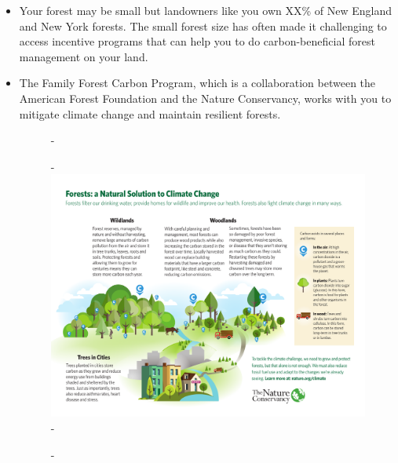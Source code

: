 \documentclass{article}\usepackage[]{graphicx}\usepackage[]{color}
\begin{document}
  \begin{itemize}
  \item Your forest may be small but landowners like you own XX\% of New England and New York forests. The small forest size has often made it challenging to access incentive programs that can help you to do carbon-beneficial forest management on your land.
  
  \item The Family Forest Carbon Program, which is a collaboration between the American Forest Foundation and the Nature Conservancy, works with you to mitigate climate change and maintain resilient forests. 

  {\begin{figure} [H]
  -\begin{center}
  -\includegraphics[width=16cm]{..//figures/TNC-forestC.pdf}\label{fig:carbon}
  -\end{center}
  -\end{figure}}

  
   
  \end{itemize}
\end{document}
